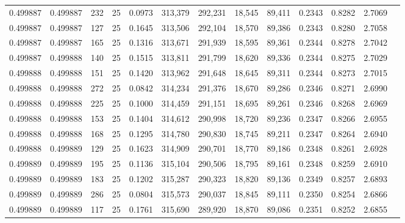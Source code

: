 \begin{tabular}{rrrrrrrrrrrrr}
0.499887 & 0.499887 &   232 &  25 &                                     0.0973 & 313,379 & 292,231 &  18,545 &  89,411 & 0.2343 & 0.8282 & 2.7069 \\
0.499887 & 0.499887 &   127 &  25 &                                     0.1645 & 313,506 & 292,104 &  18,570 &  89,386 & 0.2343 & 0.8280 & 2.7058 \\
0.499887 & 0.499887 &   165 &  25 &                                     0.1316 & 313,671 & 291,939 &  18,595 &  89,361 & 0.2344 & 0.8278 & 2.7042 \\
0.499887 & 0.499888 &   140 &  25 &                                     0.1515 & 313,811 & 291,799 &  18,620 &  89,336 & 0.2344 & 0.8275 & 2.7029 \\
0.499888 & 0.499888 &   151 &  25 &                                     0.1420 & 313,962 & 291,648 &  18,645 &  89,311 & 0.2344 & 0.8273 & 2.7015 \\
0.499888 & 0.499888 &   272 &  25 &                                     0.0842 & 314,234 & 291,376 &  18,670 &  89,286 & 0.2346 & 0.8271 & 2.6990 \\
0.499888 & 0.499888 &   225 &  25 &                                     0.1000 & 314,459 & 291,151 &  18,695 &  89,261 & 0.2346 & 0.8268 & 2.6969 \\
0.499888 & 0.499888 &   153 &  25 &                                     0.1404 & 314,612 & 290,998 &  18,720 &  89,236 & 0.2347 & 0.8266 & 2.6955 \\
0.499888 & 0.499888 &   168 &  25 &                                     0.1295 & 314,780 & 290,830 &  18,745 &  89,211 & 0.2347 & 0.8264 & 2.6940 \\
0.499888 & 0.499889 &   129 &  25 &                                     0.1623 & 314,909 & 290,701 &  18,770 &  89,186 & 0.2348 & 0.8261 & 2.6928 \\
0.499889 & 0.499889 &   195 &  25 &                                     0.1136 & 315,104 & 290,506 &  18,795 &  89,161 & 0.2348 & 0.8259 & 2.6910 \\
0.499889 & 0.499889 &   183 &  25 &                                     0.1202 & 315,287 & 290,323 &  18,820 &  89,136 & 0.2349 & 0.8257 & 2.6893 \\
0.499889 & 0.499889 &   286 &  25 &                                     0.0804 & 315,573 & 290,037 &  18,845 &  89,111 & 0.2350 & 0.8254 & 2.6866 \\
0.499889 & 0.499889 &   117 &  25 &                                     0.1761 & 315,690 & 289,920 &  18,870 &  89,086 & 0.2351 & 0.8252 & 2.6855 \\

\end{tabular}
